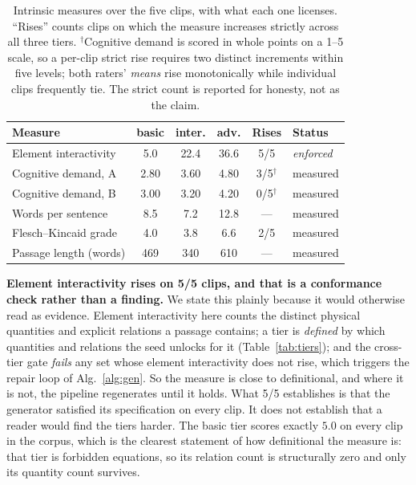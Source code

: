 \documentclass[conference]{IEEEtran}
\begin{document}
\begin{table}[t]
\caption{Intrinsic measures over the five clips, with what each one licenses.
``Rises'' counts clips on which the measure increases strictly across all three
tiers. $^\dag$Cognitive demand is scored in whole points on a 1--5 scale, so a
per-clip strict rise requires two distinct increments within five levels; both
raters' \emph{means} rise monotonically while individual clips frequently tie.
The strict count is reported for honesty, not as the claim.}
\label{tab:ladder}
\centering
\footnotesize
\begin{tabular}{@{}lccccl@{}}
\toprule
\textbf{Measure} & \textbf{basic} & \textbf{inter.} & \textbf{adv.} & \textbf{Rises} & \textbf{Status} \\
\midrule
Element interactivity & 5.0 & 22.4 & 36.6 & 5/5 & \emph{enforced} \\
Cognitive demand, A & 2.80 & 3.60 & 4.80 & 3/5$^\dag$ & measured \\
Cognitive demand, B & 3.00 & 3.20 & 4.20 & 0/5$^\dag$ & measured \\
\addlinespace[2pt]
Words per sentence & 8.5 & 7.2 & 12.8 & --- & measured \\
Flesch--Kincaid grade & 4.0 & 3.8 & 6.6 & 2/5 & measured \\
Passage length (words) & 469 & 340 & 610 & --- & measured \\
\bottomrule
\end{tabular}
\end{table}

\textbf{Element interactivity rises on 5/5 clips, and that is a conformance
check rather than a finding.} We state this plainly because it would otherwise
read as evidence. Element interactivity here counts the distinct physical
quantities and explicit relations a passage contains; a tier is \emph{defined}
by which quantities and relations the seed unlocks for it
(Table~\ref{tab:tiers}); and the cross-tier gate \emph{fails} any set whose
element interactivity does not rise, which triggers the repair loop of
Alg.~\ref{alg:gen}. So the measure is close to definitional, and where it is
not, the pipeline regenerates until it holds. What 5/5 establishes is that the
generator satisfied its specification on every clip. It does not establish that
a reader would find the tiers harder. The basic tier scores exactly $5.0$ on
every clip in the corpus, which is the clearest statement of how definitional
the measure is: that tier is forbidden equations, so its relation count is
structurally zero and only its quantity count survives.
\end{document}
